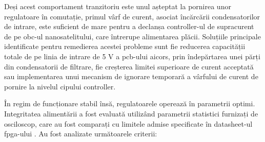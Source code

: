 \documentclass[12pt,a4paper]{report}
\begin{document}
Deși acest comportament tranzitoriu este unul așteptat la pornirea unor regulatoare în comutație, primul vârf de curent, asociat încărcării condensatorilor de intrare, este suficient de mare pentru a declanșa controller-ul de supracurent de pe \gls{obc}-ul nanosatelitului, care întrerupe alimentarea plăcii. Soluțiile principale identificate pentru remedierea acestei probleme sunt fie reducerea capacității totale de pe linia de intrare de 5 V a \gls{pcb}-ului \gls{aicors}, prin îndepărtarea unei părți din condensatorii de filtrare, fie creșterea limitei superioare de curent acceptată sau implementarea unui mecanism de ignorare temporară a vârfului de curent de pornire la nivelul cipului controller.

În regim de funcționare stabil însă, regulatoarele operează în parametrii optimi. Integritatea alimentării a fost evaluată utilizând parametrii statistici furnizați de osciloscop, care au fost comparați cu limitele admise specificate în datasheet-ul \gls{fpga}-ului \cite{ds181}. Au fost analizate următoarele criterii:
\end{document}
